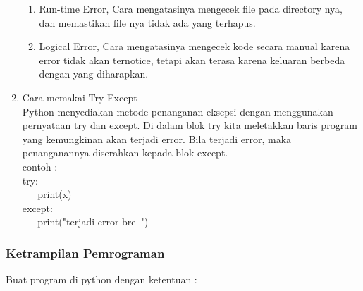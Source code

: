 \begin{enumerate}
\begin{enumerate}
\item Run-time Error, Cara mengatasinya mengecek file pada directory nya, dan memastikan file nya tidak ada yang terhapus.\\
\item Logical Error, Cara mengatasinya mengecek kode secara manual karena error tidak akan ternotice, tetapi akan terasa karena keluaran berbeda dengan yang diharapkan.\\
\end{enumerate}
\item Cara memakai Try Except\\
Python menyediakan metode penanganan eksepsi dengan menggunakan pernyataan try dan except. Di dalam blok try kita meletakkan baris program yang kemungkinan akan terjadi error. Bila terjadi error, maka penanganannya diserahkan kepada blok except.\\
contoh :\\
try:\\
\verb|   |print(x)\\
except:\\
\verb|   |print("terjadi error bre~")\\
\end{enumerate}

\subsubsection{Ketrampilan Pemrograman}
Buat program di python dengan ketentuan :

